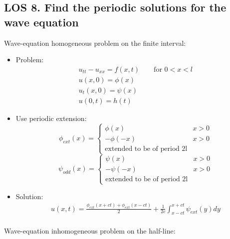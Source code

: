 \documentclass[12pt, a4paper]{article}
\begin{document}
\subsection*{LOS 8. Find the periodic solutions for the wave equation}
Wave-equation homogeneous problem on the finite interval:
\begin{itemize}
    \item Problem:
    \begin{gather*}
        u_{tt} - u_{xx} = f(x, t) \qquad\text{for }0<x<l\\
        u(x, 0) = \phi(x)\\
        u_t(x,0) = \psi(x)\\
        u(0, t)=h(t)
    \end{gather*}
    \item Use periodic extension:
    \[ \phi_{ext}(x) = \begin{cases} 
        \phi(x) & x > 0 \\
        -\phi(-x) & x > 0 \\
        \text{extended to be of period 2l}
     \end{cases}
    \]
    \[ \psi_{odd}(x) = \begin{cases} 
        \psi(x) & x > 0 \\
        -\psi(-x) & x > 0 \\
        \text{extended to be of period 2l}
     \end{cases}
    \]
    \item Solution:
    \begin{gather*}
        u(x, t) = \frac{\phi_{ext}(x+ct) + \phi_{ext}(x-ct)}{2} + \frac{1}{2c} \int_{x-ct}^{x+ct}\psi_{ext}(y)dy \\
    \end{gather*}
\end{itemize}
Wave-equation inhomogeneous problem on the half-line:
\end{document}
